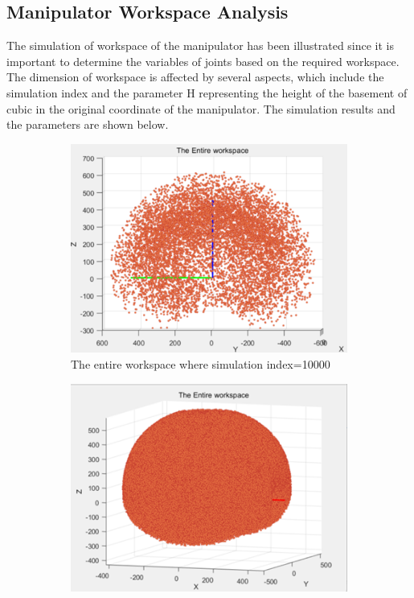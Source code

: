 \subsection{Manipulator Workspace Analysis}
The simulation of workspace of the manipulator has been illustrated since it is important to determine the 
variables of joints based on the required workspace. The dimension of workspace is affected by several aspects, 
which include the simulation index and the parameter H representing the height of the basement of cubic in the 
original coordinate of the manipulator. The simulation results and the parameters are shown below.
\begin{figure}[H] %
    \centering %
    \captionsetup{labelsep=colon}
    \begin{subfigure}{0.45\textwidth} %
        \centering
        \includegraphics[width=\linewidth]{Image/Result/workspace_10000.png}
        \caption{\centering The entire workspace where simulation index=10000}
        \label{fig:ws_10000}
    \end{subfigure}
    \hfill
    \begin{subfigure}{0.45\textwidth} %
        \centering
        \includegraphics[width=\linewidth]{Image/Result/workspace_1000000.png}

\end{subfigure}
\end{figure}
